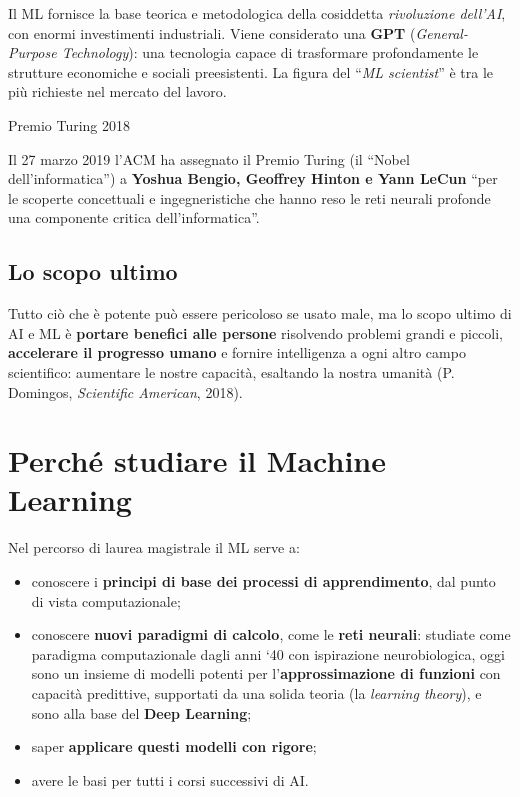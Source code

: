 Il ML fornisce la base teorica e metodologica della cosiddetta
\emph{rivoluzione dell'AI}, con enormi investimenti industriali. Viene
considerato una \textbf{GPT} (\emph{General-Purpose Technology}): una
tecnologia capace di trasformare profondamente le strutture economiche e
sociali preesistenti. La figura del ``\emph{ML scientist}'' è tra le più
richieste nel mercato del lavoro.

\begin{boxnote}{Premio Turing 2018}

Il 27 marzo 2019 l'ACM ha assegnato il Premio Turing (il ``Nobel
dell'informatica'') a \textbf{Yoshua Bengio, Geoffrey Hinton e Yann
LeCun} ``per le scoperte concettuali e ingegneristiche che hanno reso le
reti neurali profonde una componente critica dell'informatica''.

\end{boxnote}

\subsection{Lo scopo ultimo}\label{lo-scopo-ultimo}

Tutto ciò che è potente può essere pericoloso se usato male, ma lo scopo
ultimo di AI e ML è \textbf{portare benefici alle persone} risolvendo
problemi grandi e piccoli, \textbf{accelerare il progresso umano} e
fornire intelligenza a ogni altro campo scientifico: aumentare le nostre
capacità, esaltando la nostra umanità (P. Domingos, \emph{Scientific
American}, 2018).

\section{Perché studiare il Machine
Learning}\label{perchuxe9-studiare-il-machine-learning}

Nel percorso di laurea magistrale il ML serve a:

\begin{itemize}
\tightlist
\item
  conoscere i \textbf{principi di base dei processi di apprendimento},
  dal punto di vista computazionale;
\item
  conoscere \textbf{nuovi paradigmi di calcolo}, come le \textbf{reti
  neurali}: studiate come paradigma computazionale dagli anni `40 con
  ispirazione neurobiologica, oggi sono un insieme di modelli potenti
  per l'\textbf{approssimazione di funzioni} con capacità predittive,
  supportati da una solida teoria (la \emph{learning theory}), e sono
  alla base del \textbf{Deep Learning};
\item
  saper \textbf{applicare questi modelli con rigore};
\item
  avere le basi per tutti i corsi successivi di AI.
\end{itemize}

